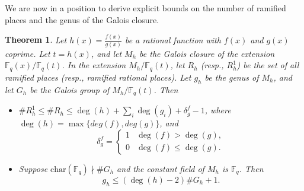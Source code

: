 \documentclass[1p,final]{elsarticle}
\newtheorem{theorem}{Theorem}[section]
\newtheorem{open problem}[theorem]{Open Problem}
\begin{document}
\medskip

We are now in a position to derive explicit bounds on the number of ramified places and the genus of the Galois closure.

\begin{theorem} \label{21e}
Let $h(x)=\displaystyle\frac{f(x)}{g(x)}$ be a rational function with $f(x)$ and $g(x)$ coprime. Let $t=h(x)$, and let $M_{h}$ be the Galois closure of the extension $\mathbb{F}_q(x)/\mathbb{F}_q(t)$. In the extension $M_{h}/\mathbb{F}_q(t)$, let $R_{h}$ (resp., $R_{h}^{1}$) be the set of all ramified places (resp., ramified rational places). Let $g_{h}$ be the genus of $M_{h}$, and let $G_{h}$ be the Galois group of $M_{h}/\mathbb{F}_q(t)$. Then 

\begin{itemize}
\item[(i)] $\#R_{h}^{1}\le \#R_{h}\le \deg(h)+\displaystyle\sum_{i}\deg(g_{i})+\delta_{g}^{f}-1$, where $\deg(h)=\max\{deg(f), deg(g)  \}$, and
$$\delta_{g}^{f}=\begin{cases}
1 & \deg(f)>\deg(g), \\
0 & \deg(f)\le\deg(g).
\end{cases}$$

\item[(ii)] Suppose $\text{char}(\mathbb{F}_{q})\nmid \#G_{h}$ and the constant field of $M_{h}$ is $\mathbb{F}_{q}$. Then
$$g_{h}\le (\deg(h)-2)\#G_{h}+1.$$
\end{itemize}
\end{theorem}
\end{document}
